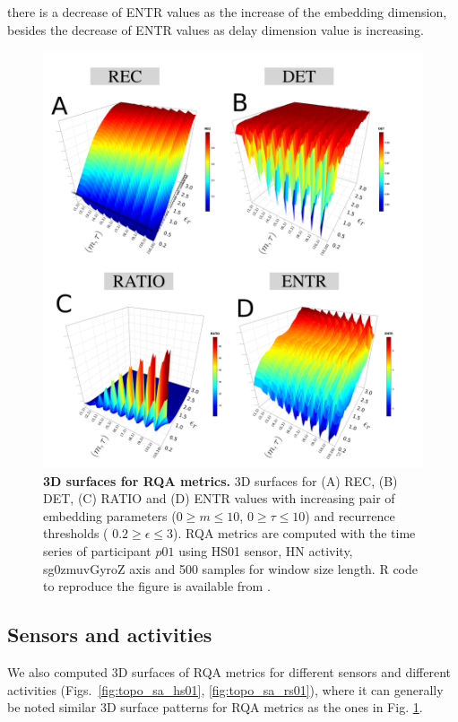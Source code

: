 there is a decrease of ENTR values as the increase of the embedding dimension,
besides the decrease of ENTR values as delay dimension value is increasing.
\begin{figure}[!ht]
\centering
\includegraphics[width=1.0\textwidth]{rqas}
    \caption{
	{\bf 3D surfaces for RQA metrics.}
	3D surfaces for (A) REC, (B) DET, (C) RATIO and (D) ENTR values 
	with increasing pair of embedding parameters 
	($0 \ge m \le 10$, $0 \ge \tau \le 10$) 
	and recurrence thresholds (  $ 0.2 \ge \epsilon \le 3 $).
	RQA metrics are computed with the time series of participant $p01$ using 
	HS01 sensor, HN activity, sg0zmuvGyroZ axis and 500 samples 
	for window size length.
        R code to reproduce the figure is available from \cite{hwum2018}.
	}
\label{fig:topo_rqas}
\end{figure}


\newpage
\subsection{Sensors and activities}
We also computed 3D surfaces of RQA metrics for different sensors 
and different activities 
(Figs.~\ref{fig:topo_sa_hs01}, \ref{fig:topo_sa_rs01}), where it can 
generally be noted similar 3D surface patterns for RQA metrics as the ones
in Fig. \ref{fig:topo_rqas}. 

